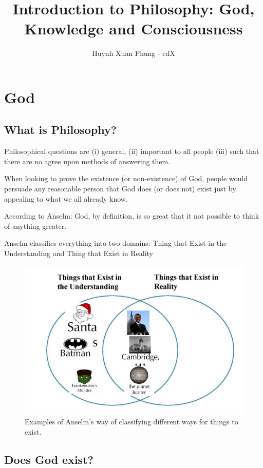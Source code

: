 \documentclass{book}
\title{Introduction to Philosophy: God, Knowledge and Consciousness}
\author{Huynh Xuan Phung - edX}
\date{ }
\begin{document}
 
\maketitle
 
\tableofcontents
\section{God}


\subsection{What is Philosophy?}
Philosophical questions are (i) general, (ii) important to all people (iii) such that there are no agree upon methods of answering them.

When looking to prove the existence (or non-existence) of God, people would persuade any reasonable person that God does (or does not) exist just by appealing to what we all already know.

According to Anselm: God, by definition, is so great that it not possible to think of anything greater.

Anselm classifies everything into two domains: Thing that Exist in the Understanding and Thing that Exist in Reality

\begin{figure}
\includegraphics[scale=0.6]{figures/Understanding_Reality.png}
\caption{Examples of Anselm's way of classifying different ways for things to exist.}
\end{figure}


\subsection{Does God exist?}
\end{document}
